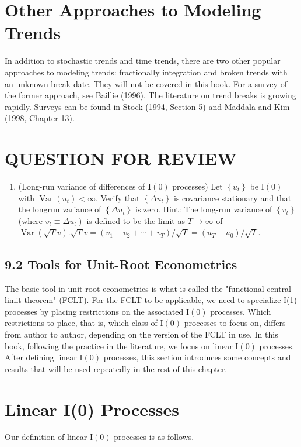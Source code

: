 \documentclass[10pt]{article}
\begin{document}
\section*{Other Approaches to Modeling Trends}
In addition to stochastic trends and time trends, there are two other popular approaches to modeling trends: fractionally integration and broken trends with an unknown break date. They will not be covered in this book. For a survey of the former approach, see Baillie (1996). The literature on trend breaks is growing rapidly. Surveys can be found in Stock (1994, Section 5) and Maddala and Kim (1998, Chapter 13).

\section*{QUESTION FOR REVIEW}
\begin{enumerate}
  \item (Long-run variance of differences of $\mathbf{I}(0)$ processes) Let $\left\{u_{t}\right\}$ be $\mathrm{I}(0)$ with $\operatorname{Var}\left(u_{t}\right)<\infty$. Verify that $\left\{\Delta u_{t}\right\}$ is covariance stationary and that the longrun variance of $\left\{\Delta u_{t}\right\}$ is zero. Hint: The long-run variance of $\left\{v_{t}\right\}$ (where $\left.v_{t} \equiv \Delta u_{t}\right)$ is defined to be the limit as $T \rightarrow \infty$ of $\operatorname{Var}(\sqrt{T} \bar{v}) . \sqrt{T} \bar{v}= \left(v_{1}+v_{2}+\cdots+v_{T}\right) / \sqrt{T}=\left(u_{T}-u_{0}\right) / \sqrt{T}$.
\end{enumerate}

\subsection*{9.2 Tools for Unit-Root Econometrics}
The basic tool in unit-root econometrics is what is called the "functional central limit theorem" (FCLT). For the FCLT to be applicable, we need to specialize I(1) processes by placing restrictions on the associated $\mathrm{I}(0)$ processes. Which restrictions to place, that is, which class of $\mathrm{I}(0)$ processes to focus on, differs from author to author, depending on the version of the FCLT in use. In this book, following the practice in the literature, we focus on linear $\mathrm{I}(0)$ processes. After defining linear $\mathrm{I}(0)$ processes, this section introduces some concepts and results that will be used repeatedly in the rest of this chapter.

\section*{Linear I(0) Processes}
Our definition of linear $\mathrm{I}(0)$ processes is as follows.
\end{document}
